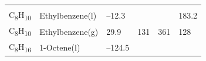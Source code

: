 \documentclass[
  9pt,
]{extbook}
\theoremstyle{definition}
\theoremstyle{definition}
\theoremstyle{definition}
\theoremstyle{remark}
\begin{document}
\begin{longtable}[]{@{}llllll@{}}
\begin{minipage}[t]{0.14\columnwidth}
\strut
\end{minipage}\tabularnewline
\begin{minipage}[t]{0.07\columnwidth}\raggedright
C\textsubscript{8}H\textsubscript{10}\strut
\end{minipage} & \begin{minipage}[t]{0.17\columnwidth}\raggedright
Ethylbenzene(l)\strut
\end{minipage} & \begin{minipage}[t]{0.15\columnwidth}\raggedright
--12.3\strut
\end{minipage} & \begin{minipage}[t]{0.15\columnwidth}\raggedright
\strut
\end{minipage} & \begin{minipage}[t]{0.14\columnwidth}\raggedright
\strut
\end{minipage} & \begin{minipage}[t]{0.14\columnwidth}\raggedright
183.2\strut
\end{minipage}\tabularnewline
\begin{minipage}[t]{0.07\columnwidth}\raggedright
C\textsubscript{8}H\textsubscript{10}\strut
\end{minipage} & \begin{minipage}[t]{0.17\columnwidth}\raggedright
Ethylbenzene(g)\strut
\end{minipage} & \begin{minipage}[t]{0.15\columnwidth}\raggedright
29.9\strut
\end{minipage} & \begin{minipage}[t]{0.15\columnwidth}\raggedright
131\strut
\end{minipage} & \begin{minipage}[t]{0.14\columnwidth}\raggedright
361\strut
\end{minipage} & \begin{minipage}[t]{0.14\columnwidth}\raggedright
128\strut
\end{minipage}\tabularnewline
\begin{minipage}[t]{0.07\columnwidth}\raggedright
C\textsubscript{8}H\textsubscript{16}\strut
\end{minipage} & \begin{minipage}[t]{0.17\columnwidth}\raggedright
1-Octene(l)\strut
\end{minipage} & \begin{minipage}[t]{0.15\columnwidth}\raggedright
--124.5\strut
\end{minipage} & \begin{minipage}[t]{0.15\columnwidth}\raggedright

\end{minipage}
\end{longtable}
\end{document}
